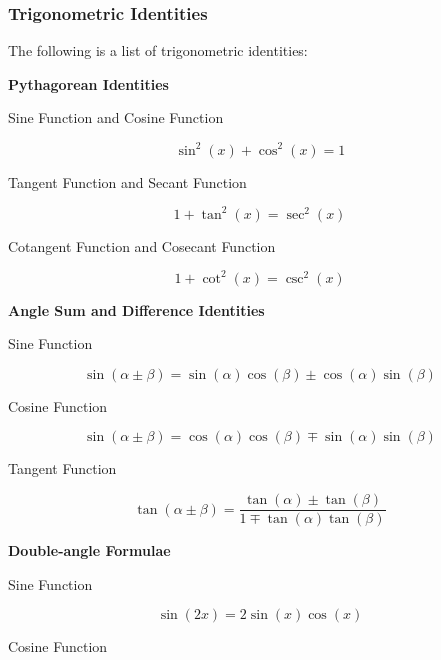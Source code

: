 \documentclass[a4paper,12pt]{article}
\begin{document}
\subsubsection{Trigonometric Identities}
\begin{pst}
  The following is a list of trigonometric identities:

  \begin{alist}
    \item \textbf{Pythagorean Identities}

    \begin{rlist}
      \item Sine Function and Cosine Function

      $$\sin^{2}(x)+\cos^{2}(x)=1$$

      \item Tangent Function and Secant Function

      $$1+\tan^{2}(x)=\sec^{2}(x)$$

      \item Cotangent Function and Cosecant Function

      $$1+\cot^{2}(x)=\csc^{2}(x)$$
    \end{rlist}

    \item \textbf{Angle Sum and Difference Identities}

    \begin{rlist}
      \item Sine Function

      $$\sin(\alpha\pm\beta)=\sin(\alpha)\cos(\beta)\pm\cos(\alpha)\sin(\beta)$$

      \item Cosine Function

      $$\sin(\alpha\pm\beta)=\cos(\alpha)\cos(\beta)\mp\sin(\alpha)\sin(\beta)$$

      \item Tangent Function

      $$\tan(\alpha\pm\beta)=\frac{\tan(\alpha)\pm\tan(\beta)}{1\mp \tan(\alpha)\tan(\beta)}$$
    \end{rlist}

    \item \textbf{Double-angle Formulae}

    \begin{rlist}
      \item Sine Function

      $$\sin(2x)=2\sin(x)\cos(x)$$

      \item Cosine Function


\end{rlist}
\end{alist}
\end{pst}
\end{document}
